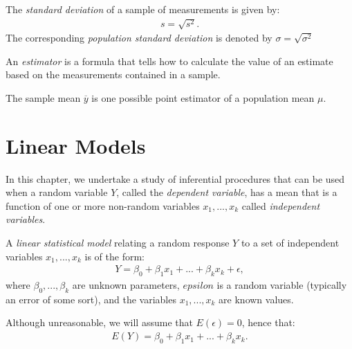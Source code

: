    \begin{definition}
        The \textit{standard deviation} of a sample of measurements is given by:
            \begin{equation*}
            \begin{split}
                s = \sqrt{s^2}.
            \end{split}
            \end{equation*}
        The corresponding \textit{population standard deviation} is denoted by $\sigma = \sqrt{\sigma^2}$
    \end{definition}

    \begin{definition}
        An \textit{estimator} is a formula that tells how to calculate the value of an estimate based on the measurements contained in a sample.
    \end{definition}

    \begin{example}
        The sample mean $\overline{y}$ is one possible point estimator of a population mean $\mu$.
    \end{example}

\section{Linear Models}
    In this chapter, we undertake a study of inferential procedures that can be used
    when a random variable $Y$, called the \textit{dependent variable}, has a mean that is a function of one or more non-random variables $x_1,...,x_k$ called \textit{independent variables}.

    \begin{definition}
        A \textit{linear statistical model} relating a random response $Y$ to a set of independent variables $x_1,...,x_k$ is of the form:
            \begin{equation*}
            \begin{split}
                Y = \beta_0 + \beta_1 x_1 + ... + \beta_k x_k + \epsilon,
            \end{split}
            \end{equation*}
        where $\beta_0,...,\beta_k$ are unknown parameters, $epsilon$ is a random variable (typically an error of some sort), and the variables $x_1,...,x_k$ are known values. 
    \end{definition}

    \begin{remark}
        Although unreasonable, we will assume that $E(\epsilon) = 0$, hence that:
            \begin{equation*}
            \begin{split}
                E(Y) = \beta_0 + \beta_1 x_1 + ... + \beta_k x_k.
            \end{split}
            \end{equation*}
    \end{remark}

